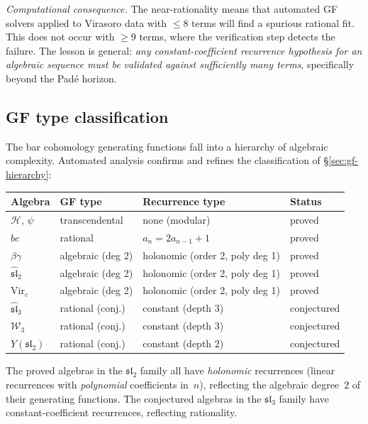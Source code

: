 \emph{Computational consequence.} The near-rationality means that
automated GF solvers applied to Virasoro data with $\leq 8$ terms
will find a spurious rational fit. This does not occur with $\geq 9$
terms, where the verification step detects the failure. The lesson
is general: \emph{any constant-coefficient recurrence hypothesis
for an algebraic sequence must be validated against sufficiently
many terms}, specifically beyond the Padé horizon.

\subsection{GF type classification}
\label{subsec:gf-type-classification}

The bar cohomology generating functions fall into a hierarchy of
algebraic complexity. Automated analysis confirms and refines the
classification of \S\ref{sec:gf-hierarchy}:

\begin{center}
\renewcommand{\arraystretch}{1.3}
\begin{tabular}{llll}
\toprule
\textbf{Algebra} & \textbf{GF type} & \textbf{Recurrence type} &
 \textbf{Status} \\
\midrule
$\mathcal{H}$, $\psi$ & transcendental & none (modular) & proved \\
$bc$ & rational & $a_n = 2a_{n-1} + 1$ & proved \\
$\beta\gamma$ & algebraic (deg 2) & holonomic (order 2, poly deg 1) & proved \\
$\widehat{\mathfrak{sl}}_2$ & algebraic (deg 2) & holonomic (order 2, poly deg 1) & proved \\
$\mathrm{Vir}_c$ & algebraic (deg 2) & holonomic (order 2, poly deg 1) & proved \\
$\widehat{\mathfrak{sl}}_3$ & rational (conj.) & constant (depth 3) & conjectured \\
$\mathcal{W}_3$ & rational (conj.) & constant (depth 3) & conjectured \\
$Y(\mathfrak{sl}_2)$ & rational (conj.) & constant (depth 2) & conjectured \\
\bottomrule
\end{tabular}
\end{center}

The proved algebras in the $\mathfrak{sl}_2$ family all have
\emph{holonomic} recurrences (linear recurrences with
\emph{polynomial} coefficients in~$n$), reflecting the algebraic
degree~$2$ of their generating functions. The conjectured algebras
in the $\mathfrak{sl}_3$ family have constant-coefficient recurrences,
reflecting rationality.

